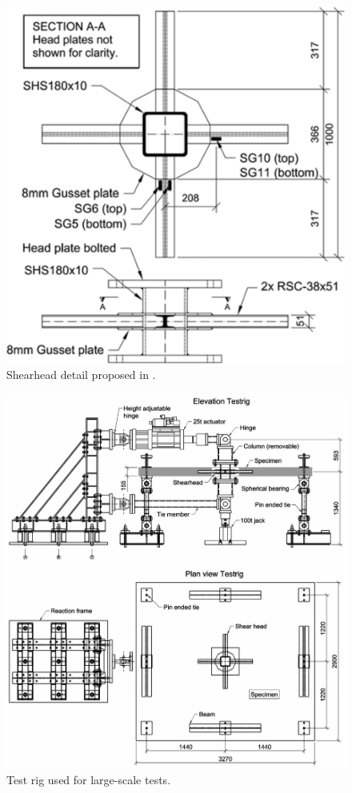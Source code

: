 \documentclass[twocolumn]{article} %
\begin{document}
\begin{figure}\centering
    \includegraphics[width=\columnwidth]{Figures/e2011f4.pdf}
    \caption{Shearhead detail proposed in \cite{EDER20111164}.}
    \label{e2011f4}
    \end{figure}
\begin{figure}\centering
    \includegraphics[width=\columnwidth]{Figures/e2012f1.pdf}
    \caption{Test rig used for large-scale tests\citep{EDER2012239}.}
    \label{e2012f1}
    \end{figure}
\end{document}
